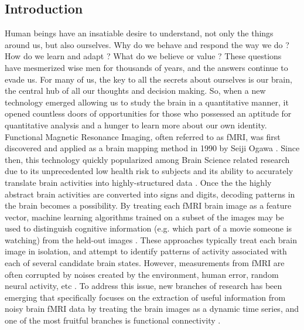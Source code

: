 \documentclass[12pt]{article}
\begin{document}
\subsection{Introduction}
Human beings have an insatiable desire to understand, not only the things around us, but also ourselves. Why do we behave and respond the way we do \cite{hasson2012}? How do we learn and adapt \cite{hasson2004}\cite{hasson2005}? What do we believe or value \cite{Greene01}? These questions have mesmerized wise men for thousands of years, and the answers continue to evade us. For many of us, the key to all the secrets about ourselves is our brain, the central hub of all our thoughts and decision making. So, when a new technology emerged allowing us to study the brain in a quantitative manner, it opened countless doors of opportunities for those who possessed an aptitude for quantitative analysis and a hunger to learn more about our own identity.\\

Functional Magnetic Resonance Imaging, often referred to as fMRI, was first discovered and applied as a brain mapping method in 1990 by Seiji Ogawa \cite{Ogawa90}. Since then, this technology quickly popularized among Brain Science related research due to its unprecedented low health risk to subjects and its ability to accurately translate brain activities into highly-structured data \cite{Logothetis01}. Once the the highly abstract brain activities are converted into signs and digits, decoding patterns in the brain becomes a possibility. By treating each fMRI brain image as a feature vector, machine learning algorithms trained on a subset of the images may be used to distinguish cognitive information (e.g. which part of a movie someone is watching) from the held-out images \cite{Norman06}\cite{peterson12}\cite{peterson17}. These approaches typically treat each brain image in isolation, and attempt to identify patterns of activity associated with each of several candidate brain states. However, measurements from fMRI are often corrupted by noises created by the environment, human error, random neural activity, etc \cite{peterson11}. To address this issue, new branches of research has been emerging that specifically focuses on the extraction of useful information from noisy brain fMRI data by treating the brain images as a dynamic time series, and one of the most fruitful branches is functional connectivity \cite{peterson9} \cite{peterson19} \cite{peterson20}.\\
\end{document}
